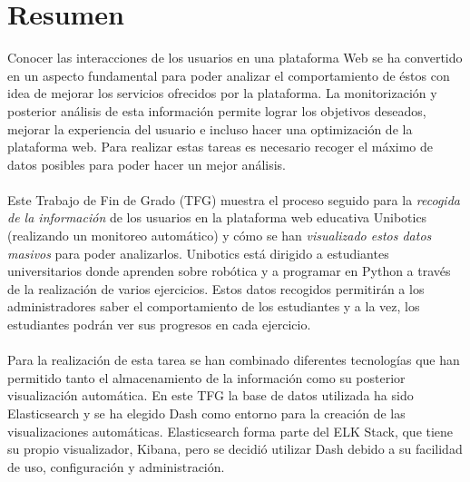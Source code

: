 \newpage
\thispagestyle{plain}			%
\setlength{\parskip}{0pt plus 1.0pt}
\section*{Resumen}
Conocer las interacciones de los usuarios en una plataforma Web se ha convertido en un aspecto fundamental para poder analizar el comportamiento de éstos con idea de mejorar los servicios ofrecidos por la plataforma. La monitorización y posterior análisis de esta información permite lograr los objetivos deseados, mejorar la experiencia del usuario e incluso hacer una optimización de la plataforma web. Para realizar estas tareas es necesario recoger el máximo de datos posibles para poder hacer un mejor análisis.
\\
 \\
Este Trabajo de Fin de Grado (TFG) muestra el proceso seguido para la \textit{recogida de la información} de los usuarios en la plataforma web educativa Unibotics (realizando un monitoreo automático) y cómo se han \textit{visualizado estos datos masivos} para poder analizarlos. Unibotics está dirigido a estudiantes universitarios donde aprenden sobre robótica y a programar en Python a través de la realización de varios ejercicios. Estos datos recogidos permitirán a los administradores saber el comportamiento de los estudiantes y a la vez, los estudiantes podrán ver sus progresos en cada ejercicio.
\\
\\
Para la realización de esta tarea se han combinado diferentes tecnologías que han permitido tanto el almacenamiento de la información como su posterior visualización automática. En este TFG la base de datos utilizada ha sido Elasticsearch y se ha elegido Dash como entorno para la creación de las visualizaciones automáticas. Elasticsearch forma parte del ELK Stack, que tiene su propio visualizador, Kibana, pero se decidió utilizar Dash debido a su facilidad de uso, configuración y administración.

